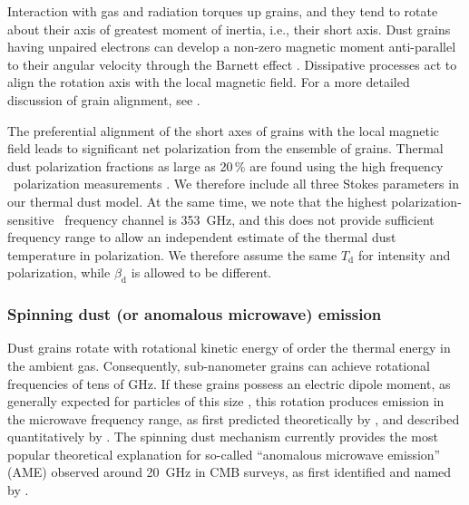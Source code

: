 \documentclass[twocolumn]{aa}
\begin{document}
Interaction with gas and radiation torques up grains, and they tend to rotate
about their axis of greatest moment of inertia, i.e., their short axis.
Dust grains having unpaired electrons can develop a non-zero
magnetic moment anti-parallel to their angular velocity through the Barnett effect
\citep{Dolginov1976}.
Dissipative processes act to align the rotation axis with the local magnetic field.
For a more detailed discussion of grain alignment, see \citet{Andersson2015}.

The preferential alignment of the short axes of grains with the local magnetic field
leads to significant net polarization from the ensemble of grains. Thermal dust polarization 
fractions as large as 20\,\% are found using the high frequency \Planck\ polarization
measurements \citep{planck2016-l11A}. We therefore include all three
Stokes parameters in our thermal dust model. At the same time, we note
that the highest polarization-sensitive \Planck\ frequency channel is
353~GHz, and this does not provide sufficient frequency range to allow
an independent estimate of the thermal dust temperature in polarization. We therefore assume
the same $T_{\mathrm{d}}$ for intensity and polarization, while
$\beta_{\mathrm{d}}$ is allowed to be different.

\subsubsection{Spinning dust (or anomalous microwave) emission}
\label{sec:ame}

Dust grains rotate with rotational kinetic energy of order the thermal
energy in the ambient gas. Consequently, sub-nanometer grains can achieve
rotational frequencies of tens of GHz. If these grains possess an electric dipole
moment, as generally expected for particles of this size \citep{MaciaEscatllar2020}, 
this rotation produces emission in the microwave frequency
range, as first predicted theoretically by \citet{erickson:1957}, and
described quantitatively by \citet{draine:1998}. The spinning dust
mechanism currently provides the most popular theoretical explanation
for so-called ``anomalous microwave emission'' (AME) observed around
20~GHz in CMB surveys, as first identified and named by
\citet{leitch:1997}.
\end{document}
